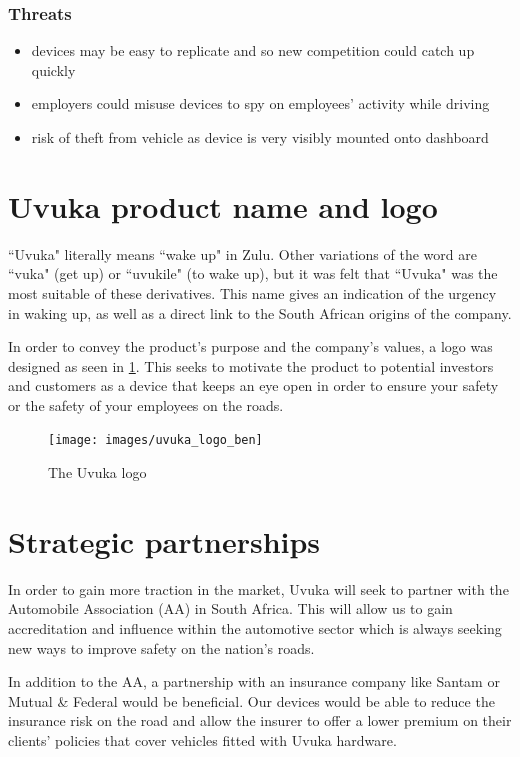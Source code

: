 \vskip15pt
\subsubsection{Threats}
\vskip8pt
\begin{itemize}
\item devices may be easy to replicate and so new competition could catch up quickly
\item employers could misuse devices to spy on employees' activity while driving
\item risk of theft from vehicle as device is very visibly mounted onto dashboard
\end{itemize}
\vskip15pt

\section{Uvuka product name and logo}
``Uvuka" literally means ``wake up" in Zulu. Other variations of the word are ``vuka" (get up) or ``uvukile" (to wake up), but it was felt that ``Uvuka" was the most suitable of these derivatives. This name gives an indication of the urgency in waking up, as well as a direct link to the South African origins of the company.

In order to convey the product's purpose and the company's values, a logo was designed as seen in \cref{fig:uvuka_logo}. This seeks to motivate the product to potential investors and customers as a device that keeps an eye open in order to ensure your safety or the safety of your employees on the roads.

\begin{figure}[H]
\centering
\texttt{[image: images/uvuka\_logo\_ben]}
\vskip10pt
\caption[The Uvuka logo]{The Uvuka logo}
\label{fig:uvuka_logo}
\end{figure}

\section{Strategic partnerships}
In order to gain more traction in the market, Uvuka will seek to partner with the Automobile Association (AA) in South Africa. This will allow us to gain accreditation and influence within the automotive sector which is always seeking new ways to improve safety on the nation's roads.

In addition to the AA, a partnership with an insurance company like Santam or Mutual \& Federal would be beneficial. Our devices would be able to reduce the insurance risk on the road and allow the insurer to offer a lower premium on their clients' policies that cover vehicles fitted with Uvuka hardware.

